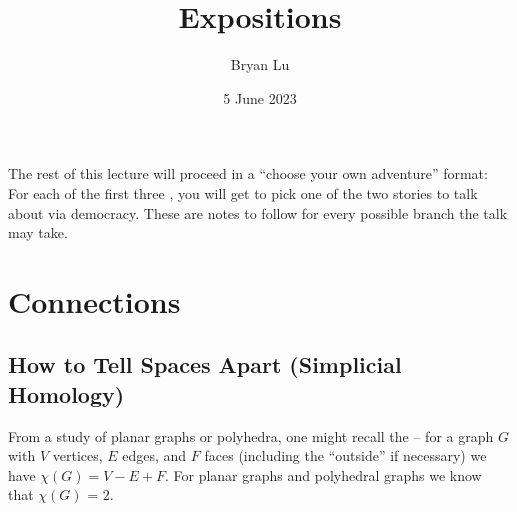 \documentclass[12pt]{article}
\title{Expositions}
\author{Bryan Lu}
\date{5 June 2023} %
\begin{document}
\maketitle

The rest of this lecture will proceed in a ``choose your own adventure'' format:
For each of the first three , you will get to pick one of the
two stories to talk about via democracy. These are notes to follow 
for every possible branch the talk may take. 

\section{Connections}
\subsection{How to Tell Spaces Apart (Simplicial Homology)}
From a study of planar graphs or polyhedra, one might recall the  -- for a graph $G$ with $V$ vertices, $E$ edges, and $F$ faces
(including the ``outside'' if necessary) we have $\chi(G) = V - E + F$. For
planar graphs and polyhedral graphs we know that $\chi(G)$ = 2. 
\end{document}
